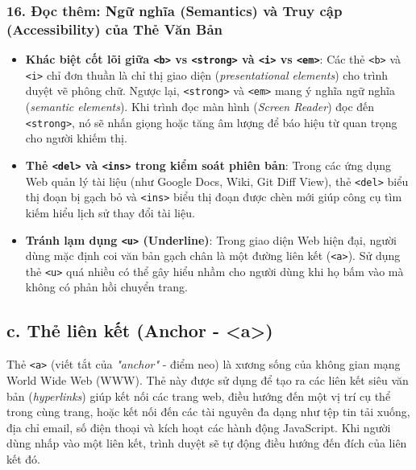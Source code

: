 \documentclass[11pt,oneside]{book}
\newcommand{\codeinline}[1]{\textcolor{accentOrange}{\texttt{#1}}}
\begin{document}
\subsubsection{16. Đọc thêm: Ngữ nghĩa (Semantics) và Truy cập (Accessibility) của Thẻ Văn Bản}

\begin{conceptBox}
\begin{itemize}[leftmargin=1.5em, itemsep=3pt, parsep=0pt]
    \item \textbf{Khác biệt cốt lõi giữa \codeinline{<b>} vs \codeinline{<strong>} và \codeinline{<i>} vs \codeinline{<em>}}: Các thẻ \codeinline{<b>} và \codeinline{<i>} chỉ đơn thuần là chỉ thị giao diện (\textit{presentational elements}) cho trình duyệt vẽ phông chữ. Ngược lại, \codeinline{<strong>} và \codeinline{<em>} mang ý nghĩa ngữ nghĩa (\textit{semantic elements}). Khi trình đọc màn hình (\textit{Screen Reader}) đọc đến \codeinline{<strong>}, nó sẽ nhấn giọng hoặc tăng âm lượng để báo hiệu từ quan trọng cho người khiếm thị.
    \item \textbf{Thẻ \codeinline{<del>} và \codeinline{<ins>} trong kiểm soát phiên bản}: Trong các ứng dụng Web quản lý tài liệu (như Google Docs, Wiki, Git Diff View), thẻ \codeinline{<del>} biểu thị đoạn bị gạch bỏ và \codeinline{<ins>} biểu thị đoạn được chèn mới giúp công cụ tìm kiếm hiểu lịch sử thay đổi tài liệu.
    \item \textbf{Tránh lạm dụng \codeinline{<u>} (Underline)}: Trong giao diện Web hiện đại, người dùng mặc định coi văn bản gạch chân là một đường liên kết (\codeinline{<a>}). Sử dụng thẻ \codeinline{<u>} quá nhiều có thể gây hiểu nhầm cho người dùng khi họ bấm vào mà không có phản hồi chuyển trang.
\end{itemize}
\end{conceptBox}

\subsection{c. Thẻ liên kết (Anchor - <a>)}

Thẻ \codeinline{<a>} (viết tắt của \textit{"anchor"} - điểm neo) là xương sống của không gian mạng World Wide Web (WWW). Thẻ này được sử dụng để tạo ra các liên kết siêu văn bản (\textit{hyperlinks}) giúp kết nối các trang web, điều hướng đến một vị trí cụ thể trong cùng trang, hoặc kết nối đến các tài nguyên đa dạng như tệp tin tải xuống, địa chỉ email, số điện thoại và kích hoạt các hành động JavaScript. Khi người dùng nhấp vào một liên kết, trình duyệt sẽ tự động điều hướng đến đích của liên kết đó.
\end{document}
